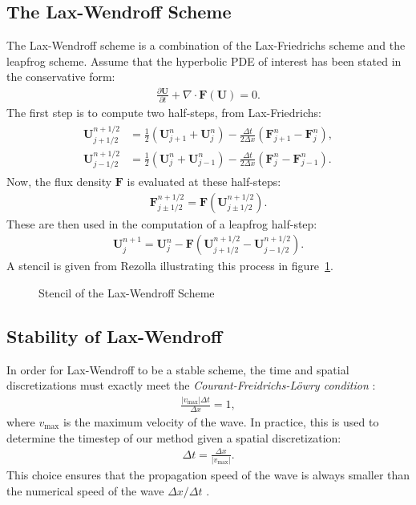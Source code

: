 \documentclass[../main.tex]{subfiles}
\begin{document}
\subsection{The Lax-Wendroff Scheme}
The Lax-Wendroff scheme \cite{rezzolla} is a combination of the Lax-Friedrichs scheme and the leapfrog scheme. Assume that the hyperbolic PDE of interest has been stated in the conservative form:
\begin{gather*}
    \frac{\partial \mathbf{U}}{\partial t} + \nabla \cdot \mathbf{F}(\mathbf{U}) = 0.    
\end{gather*}
The first step is to compute two half-steps, from Lax-Friedrichs:
\begin{gather*}
    \begin{aligned}
	   \mathbf{U}^{n+1/2}_{j+1/2} &= \frac{1}{2}(\mathbf{U}^{n}_{j+1}+\mathbf{U}^{n}_{j}) - \frac{\Delta t}{2\Delta x}(\mathbf{F}^{n}_{j+1}-\mathbf{F}^{n}_{j}),\\
       \mathbf{U}^{n+1/2}_{j-1/2} &= \frac{1}{2}(\mathbf{U}^{n}_{j}+\mathbf{U}^{n}_{j-1}) - \frac{\Delta t}{2\Delta x}(\mathbf{F}^{n}_{j}-\mathbf{F}^{n}_{j-1}).
    \end{aligned}
\end{gather*}
Now, the flux density $\mathbf{F}$ is evaluated at these half-steps:
\begin{gather*}
    \mathbf{F}^{n+1/2}_{j\pm1/2} = \mathbf{F}\left(\mathbf{U}^{n+1/2}_{j\pm1/2}\right).
\end{gather*}
These are then used in the computation of a leapfrog half-step:
\begin{gather*}
	\mathbf{U}^{n+1}_{j} = \mathbf{U}^{n}_{j}-\mathbf{F}\left(\mathbf{U}^{n+1/2}_{j+1/2}-\mathbf{U}^{n+1/2}_{j-1/2}\right).
\end{gather*}
A stencil is given from Rezolla \cite{rezzolla} illustrating this process in figure~\ref{fig:lw}.
\begin{figure}[H]
    \centering
    \fbox{\texttt{[image: lw]}}
    \caption{Stencil of the Lax-Wendroff Scheme}
    \label{fig:lw}
\end{figure}
\subsection{Stability of Lax-Wendroff}
In order for Lax-Wendroff to be a stable scheme, the time and spatial discretizations must exactly meet the \textit{Courant-Freidrichs-L\"owry condition} \cite{rezzolla}:
\begin{gather*}
    \frac{|v_{\text{max}}|\Delta t}{\Delta x} = 1,
\end{gather*}
where $v_{\text{max}}$ is the maximum velocity of the wave. In practice, this is used to determine the timestep of our method given a spatial discretization:
\begin{gather*}
    \Delta t = \frac{\Delta x}{|v_{\text{max}}|}.
\end{gather*}
This choice ensures that the propagation speed of the wave is always smaller than the numerical speed of the wave $\Delta x / \Delta t$ \cite{rezzolla}.
\end{document}
